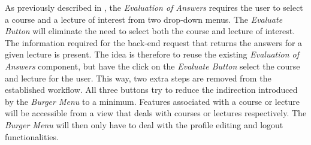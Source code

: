 \newline
\newline 
As previously described in , the \emph{Evaluation of Answers} requires the user to select a course and a lecture of interest from two drop-down menus.
The \emph{Evaluate Button} will eliminate the need to select both the course and lecture of interest. The information required for the back-end request that returns the answers for a given lecture is present. The idea is therefore to reuse the existing \emph{Evaluation of Answers} component, but have the click on the \emph{Evaluate Button} select the course and lecture for the user. This way, two extra steps are removed from the established workflow.
All three buttons try to reduce the indirection introduced by the \emph{Burger Menu} to a minimum. Features associated with a course or lecture will be accessible from a view that deals with courses or lectures respectively. The \emph{Burger Menu} will then only have to deal with the profile editing and logout functionalities.


